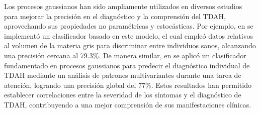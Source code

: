 Los procesos gaussianos han sido ampliamente utilizados en diversos estudios para mejorar la precisión en el diagnóstico y la comprensión del TDAH, aprovechando sus propiedades no paramétricas y estocásticas. Por ejemplo, en \cite{Lim2013} se implementó un clasificador basado en este modelo, el cual empleó datos relativos al volumen de la materia gris para discriminar entre individuos sanos, alcanzando una precisión cercana al 79.3\%. De manera similar, en \cite{Hart20143083} se aplicó un clasificador fundamentado en procesos gaussianos para predecir el diagnóstico individual de TDAH mediante un análisis de patrones multivariantes durante una tarea de atención, logrando una precisión global del 77\%. Estos resultados han permitido establecer correlaciones entre la severidad de los síntomas y el diagnóstico de TDAH, contribuyendo a una mejor comprensión de sus manifestaciones clínicas.